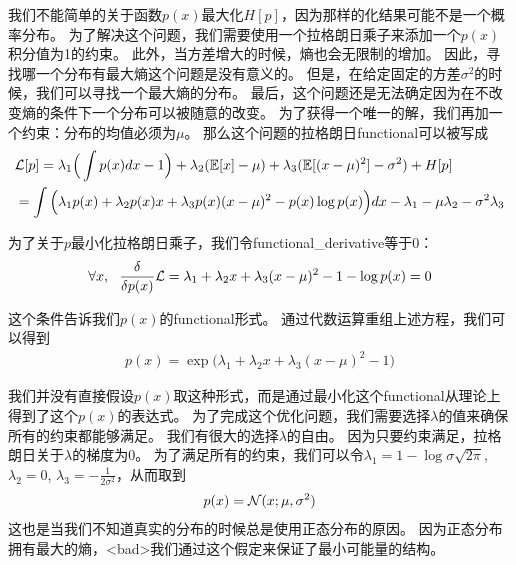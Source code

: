 我们不能简单的关于函数$p(x)$最大化$H[p]$，因为那样的化结果可能不是一个概率分布。
为了解决这个问题，我们需要使用一个拉格朗日乘子来添加一个$p(x)$积分值为1的约束。
此外，当方差增大的时候，熵也会无限制的增加。
因此，寻找哪一个分布有最大熵这个问题是没有意义的。
但是，在给定固定的方差$\sigma^2$的时候，我们可以寻找一个最大熵的分布。
最后，这个问题还是无法确定因为在不改变熵的条件下一个分布可以被随意的改变。
为了获得一个唯一的解，我们再加一个约束：分布的均值必须为$\mu$。
那么这个问题的拉格朗日\gls{functional}可以被写成
\begin{align}
\label{eqn:1950}
&		\mathcal{L}[p] =  \lambda_1 \Big(\int p(x)dx - 1\Big)  + \lambda_2 (\mathbb{E}[x] - \mu) +  \lambda_3 (\mathbb{E}[(x-\mu)^2] - \sigma^2)  + H[p]\\
& =  \int \Big(\lambda_1 p(x) + \lambda_2 p(x)x + \lambda_3 p(x)(x-\mu)^2 - p(x)\log p(x) \Big)dx - \lambda_1 - \mu \lambda_2 - \sigma^2\lambda_3
\end{align}


为了关于$p$最小化拉格朗日乘子，我们令\gls{functional_derivative}等于0：
\begin{align}
\label{eqn:1952}
	\forall x,\ \  \frac{\delta}{\delta p(x)} \mathcal{L} = \lambda_1 + \lambda_2 x + \lambda_3(x-\mu)^2 - 1 - \log p(x) = 0 
\end{align}


这个条件告诉我们$p(x)$的\gls{functional}形式。
通过代数运算重组上述方程，我们可以得到
\begin{align}
\label{eqn:1953}
	p(x) = \exp\big(\lambda_1 + \lambda_2 x + \lambda_3 (x-\mu)^2  - 1\big)
\end{align}

我们并没有直接假设$p(x)$取这种形式，而是通过最小化这个\gls{functional}从理论上得到了这个$p(x)$的表达式。
为了完成这个优化问题，我们需要选择$\lambda$的值来确保所有的约束都能够满足。
我们有很大的选择$\lambda$的自由。
因为只要约束满足，拉格朗日关于$\lambda$的梯度为0。
为了满足所有的约束，我们可以令$\lambda_1 = 1 - \log \sigma\sqrt{2\pi}$,$\lambda_2 = 0$, $\lambda_3 = - \frac{1}{2\sigma^2}$，从而取到
\begin{align}
\label{eqn:1954}
	p(x) = \mathcal{N}(x;\mu,\sigma^2)
\end{align}
这也是当我们不知道真实的分布的时候总是使用正态分布的原因。
因为正态分布拥有最大的熵，<bad>我们通过这个假定来保证了最小可能量的结构。



